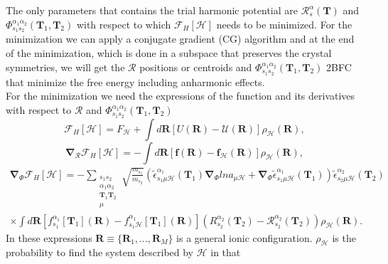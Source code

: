The only parameters that contains the trial harmonic potential are $\mathcal{R}_{s}^{\alpha}(\mathbf{T})$ and $\Phi_{s_{1}s_{2}}^{\alpha_{1}\alpha_{2}}(\mathbf{T}_{1},\mathbf{T}_{2})$ with respect to 
which $\mathcal{F}_{H}[\mathcal{H}]$ needs to be minimized. For the minimization we can apply a conjugate gradient (CG) algorithm and at the end of the minimization, which is done in a subspace that 
preserves the crystal symmetries, we will get the $\boldsymbol{\mathcal{R}}$ positions or centroids and $\Phi_{s_{1}s_{2}}^{\alpha_{1}\alpha_{2}}(\mathbf{T}_{1},\mathbf{T}_{2})$ 2BFC that minimize 
the free energy including anharmonic effects. \\

For the minimization we need the expressions of the function and its derivatives with respect to $\boldsymbol{\mathcal{R}}$ and $\Phi_{s_{1}s_{2}}^{\alpha_{1}\alpha_{2}}(\mathbf{T}_{1},\mathbf{T}_{2})$
\begin{equation}
 \label{minim1}
 \mathcal{F}_{H}[\mathcal{H}]=F_{\mathcal{H}}+\int{d\mathbf{R}[U(\mathbf{R})-\mathcal{U}(\mathbf{R})]\rho_{\mathcal{H}}(\mathbf{R})},
\end{equation}
\begin{equation}
 \label{minim2}
 \boldsymbol{\nabla}_{\boldsymbol{\mathcal{R}}}\mathcal{F}_{H}[\mathcal{H}]=-\int{d\mathbf{R}[\mathbf{f}(\mathbf{R})-\mathbf{f}_{\mathcal{H}}(\mathbf{R})]\rho_{\mathcal{H}}(\mathbf{R})},
\end{equation}
\begin{multline}
 \label{minim3}
 \boldsymbol{\nabla}_{\Phi}\mathcal{F}_{H}[\mathcal{H}]=-\sum\limits_{\substack{s_{1}s_{2} \\ \alpha_{1}\alpha_{2} \\ \mathbf{T}_{1}\mathbf{T}_{2} \\ \mu}}\sqrt{\frac{m_{s_{1}}}{m_{s_{
 2}}}}(\tilde{\epsilon}_{s_{1}\mu\mathcal{H}}^{\alpha_{1}}(\mathbf{T}_{1})\boldsymbol{\nabla}_{\Phi}lna_{\mu\mathcal{H}}+\boldsymbol{\nabla}_{\Phi}\tilde{\epsilon}_{s_{1}\mu\mathcal{H}}^{\alpha_{1}}(\mathbf{T}_{1}))
 \tilde{\epsilon}_{s_{2}\mu\mathcal{H}}^{\alpha_{2}}(\mathbf{T}_{2}) \\ \times\int{d\mathbf{R}[f_{s_{1}}^{\alpha_{1}}[\mathbf{T}_{1}](\mathbf{R})-f_{s_{1}\mathcal{H}}^{\alpha_{1}}[\mathbf{T}_{1}](\mathbf{
 R})](R_{s_{2}}^{\alpha_{2}}(\mathbf{T}_{2})-\mathcal{R}_{s_{2}}^{\alpha_{2}}(\mathbf{T}_{2}))\rho_{\mathcal{H}}(\mathbf{R})}.
\end{multline}
In these expressions $\mathbf{R}\equiv\{\mathbf{R}_{1},\dots,\mathbf{R}_{M}\}$ is a general ionic configuration. $\rho_{\mathcal{H}}$ is the probability to find the system described by $\mathcal{H}$ in that 
